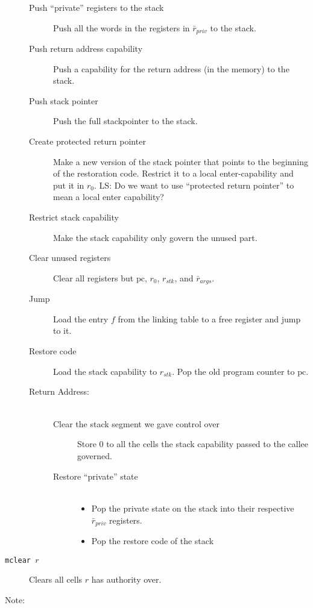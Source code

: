 \documentclass[a4paper]{article}
\newcommand{\forcenewline}{$\phantom{v}$\\}
\newcommand\lau[1]{{\color{purple} \sf \footnotesize {LS: #1}}\\}
\newcommand{\var}[1]{\mathit{#1}}
\newcommand{\pcreg}{\mathrm{pc}}
\begin{document}
\begin{description}
\begin{description}
  \item [Push ``private'' registers to the stack]
    Push all the words in the registers in  $\bar{r}_{\var{priv}}$ to the stack.
  \item [Push return address capability]
    Push a capability for the return address (in the memory) to the stack.
  \item [Push stack pointer]
    Push the full stackpointer to the stack.
  \item [Create protected return pointer]
    Make a new version of the stack pointer that points to the beginning of the restoration code. Restrict it to a local enter-capability and put it in $r_0$. \lau{Do we want to use ``protected return pointer'' to mean a local enter capability?}
  \item [Restrict stack capability]
    Make the stack capability only govern the unused part.
  \item [Clear unused registers]
    Clear all registers but $\pcreg$, $r_0$, $r_{\var{stk}}$, and $\bar{r}_{\var{args}}$.
  \item [Jump] Load the entry $f$ from the linking table to a free register and jump to it.
  \item [Restore code]
    Load the stack capability to $r_{\var{stk}}$. Pop the old program counter to $\pcreg$.
  \item [Return Address:] \forcenewline
    \begin{description}
    \item [Clear the stack segment we gave control over] Store 0 to all the cells the stack capability passed to the callee governed.
    \item [Restore ``private'' state] \forcenewline
      \begin{itemize}
      \item Pop the private state on the stack into their respective $\bar{r}_{\var{priv}}$ registers.
      \item Pop the restore code of the stack
      \end{itemize}
  \end{description}
\end{description}
\item[\texttt{mclear $r$}] Clears all cells $r$ has authority over. 
\end{description}
Note:
\end{document}

